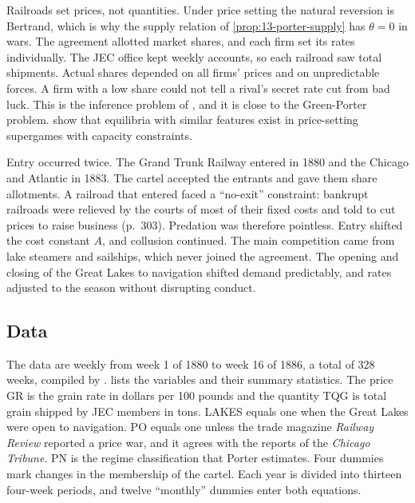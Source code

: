 Railroads set prices, not quantities. Under price setting the natural reversion is Bertrand, which is why the
supply relation of \cref{prop:13-porter-supply} has $\theta = 0$ in wars. The agreement allotted market shares, and
each firm set its rates individually. The JEC office kept weekly accounts, so each railroad saw total shipments.
Actual shares depended on all firms' prices and on unpredictable forces. A firm with a low share could not tell a
rival's secret rate cut from bad luck. This is the inference problem of \citet{Stigler1964}, and it is close to the
Green-Porter problem.  show that equilibria with similar features exist in price-setting
supergames with capacity constraints.

Entry occurred twice. The Grand Trunk Railway entered in 1880 and the Chicago and Atlantic in 1883. The cartel
accepted the entrants and gave them share allotments. A railroad that entered faced a ``no-exit'' constraint:
bankrupt railroads were relieved by the courts of most of their fixed costs and told to cut prices to raise business
(p.~303). Predation was therefore pointless. Entry shifted the cost constant $A$, and collusion continued.
The main competition came from lake steamers and sailships, which never joined the agreement. The opening and
closing of the Great Lakes to navigation shifted demand predictably, and rates adjusted to the season without
disrupting conduct.

\subsection{Data}\label{sec:13-jec-data}

The data are weekly from week 1 of 1880 to week 16 of 1886, a total of 328 weeks, compiled by \citet{Ulen1979}.
 lists the variables and their summary statistics. The price GR is the grain rate in dollars
per 100 pounds and the quantity TQG is total grain shipped by JEC members in tons. LAKES equals one when the Great
Lakes were open to navigation. PO equals one unless the trade magazine \textit{Railway Review} reported a price war,
and it agrees with the reports of the \textit{Chicago Tribune}. PN is the regime classification that Porter
estimates. Four dummies mark changes in the membership of the cartel. Each year is divided into thirteen four-week
periods, and twelve ``monthly'' dummies enter both equations.

